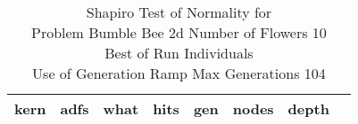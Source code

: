 \begin{table}[H]
\caption{Shapiro Test of Normality for \\ Problem  Bumble Bee 2d  Number of Flowers 10\\Best of Run Individuals \\ Use of Generation Ramp  Max Generations 104\\}
\begin{center}
\scalebox{0.8} %
{
\begin{tabular}{lrrrrrrr}
\hline
kern & adfs & what & hits & gen & nodes & depth \\
\hline


\end{tabular}
}
\end{center}
\end{table}

